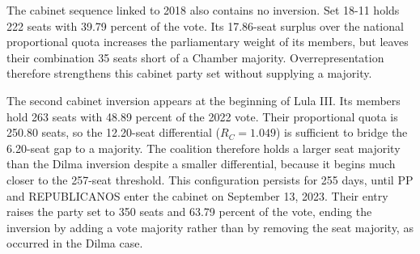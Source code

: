 \documentclass[11pt]{article}
\begin{document}
The cabinet sequence linked to 2018 also contains no inversion. Set 18-11
holds 222 seats with 39.79 percent of the vote. Its 17.86-seat surplus over
the national proportional quota increases the parliamentary weight of its
members, but leaves their combination 35 seats short of a Chamber majority.
Overrepresentation therefore strengthens this cabinet party set without
supplying a majority.



The second cabinet inversion appears at the beginning of Lula III. Its members
hold 263 seats with 48.89 percent of the 2022 vote. Their proportional quota is
250.80 seats, so the 12.20-seat differential (\(R_C=1.049\)) is sufficient to
bridge the 6.20-seat gap to a majority. The coalition therefore holds a larger
seat majority than the Dilma inversion despite a smaller differential, because
it begins much closer to the 257-seat threshold. This configuration persists
for 255 days, until PP and REPUBLICANOS enter the cabinet on September 13,
2023. Their entry raises the party set to 350 seats and 63.79 percent of the
vote, ending the inversion by adding a vote majority rather than by removing
the seat majority, as occurred in the Dilma case.
\end{document}
